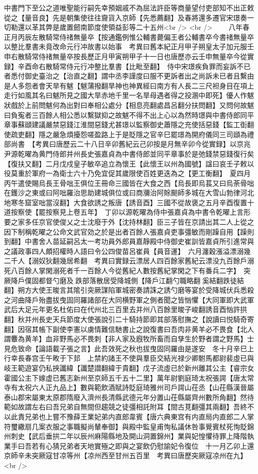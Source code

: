 中書門下至公之道唯聖能行嗣先幸預姻戚不為屈法許臣等商量望付吏部知不出正敕從之【量音良】先是朝集使往往齎貨入京師【先悉薦翻】及春將還多遷官宋璟奏一切勒還以革其弊是歲置劒南節度使領益彭等二十五州<br />
<br />
　　八年春正月丙辰左散騎常侍禇無量卒【按通鑑例惟公輔書薨偏王者公輔書卒今書禇無量卒以整比羣書未竟改命元行冲故書以始事　考異曰舊本紀正月甲子朔皇太子加元服壬申右散騎常侍禇無量卒按長歷正月甲寅朔甲子十一日也唐歷亦云壬申無量卒今從實録】辛酉命右散騎常侍元行冲整比羣書【比毗至翻】　侍中宋璟疾負罪而妄訴不已者悉付御史臺治之【治直之翻】謂中丞李謹度曰服不更訴者出之尚訴未已者且繫由是人多怨者會天旱有魃【魃蒲撥翻旱神也神異經曰南方有人長二三尺袒身目在項上走行如風其名曰魃所見之國大旱赤地千里一名旱母遇者得之投溷中即死】優人作魃狀戲於上前問魃何為出對曰奉相公處分【相息亮翻處昌呂翻分扶問翻】又問何故魃曰負寃者三百餘人相公悉以繫獄抑之故魃不得不出上心以為然時璟與中書侍郎同平章事蘇頲建議嚴禁惡錢江淮間惡錢尤甚璟以監察御史蕭隱之充使括惡錢【監工衘翻使疏吏翻】隱之嚴急煩擾怨嗟盈路上于是貶隱之官辛巳罷璟為開府儀同三司頲為禮部尚書　【考異曰唐歷云二十八日辛卯舊紀云己卯按是月無辛卯今從實録】以京兆尹源乾曜為黄門侍郎并州長史張嘉貞為中書侍郎並同平章事於是弛錢禁惡錢復行矣【復扶又翻】二月戊戍皇子敏卒追立為懷王【此懷王以州為國號】諡曰哀壬子敕以役莫重於軍府一為衛士六十乃免宜促其歲限使百姓更迭為之【更工衡翻】　夏四月丙午遣使賜烏長王骨咄王俱位王冊命三國皆在大食之西【烏長即烏萇又曰烏荼骨咄在鑊沙之東或曰阿咄羅治思助建城俱位或曰商瀰治阿賖䫻師多城在大雪山勃律河北地寒冬窟室咄當沒翻】大食欲誘之叛唐【誘音酉】三國不從故褒之五月辛酉復置十道按察使【罷按察見上卷五年】　丁卯以源乾曜為侍中張嘉貞為中書令乾曜上言形要之家多任京官使俊乂之士沈廢于外【沈持林翻】臣三子皆在京請出其二人上從之因下制稱乾曜之公命文武官効之於是出者百餘人張嘉貞吏事彊敏而剛躁自用【躁則到翻】中書舍人苗延嗣呂太一考功員外郎員嘉靜殿中侍御史崔訓皆嘉貞所引進常與之議政事四人頗招權時人語曰令公四俊苗呂崔員【員音運】　六月瀍穀漲溢漂溺幾二千人【溺奴狄翻幾居希翻　考異曰實録云漂居人四百餘家舊紀云漂没九百餘戶溺死八百餘人掌閑溺死者千一百餘人今從舊紀人數按舊紀掌閑之下有番兵二字】　突厥降戶僕固都督勺磨及跌部落散居受降城側【降戶江翻勺職略翻奚結翻跌徒結翻】朔方大使王晙言其隂引突厥謀陷軍城密奏請誅之誘勺磨等宴於受降城伏兵悉殺之河曲降戶殆盡拔曳固同羅諸部在大同横野軍之側者聞之皆忷懼【大同軍即大武軍武后大足元年更名杜佑曰在代州北三百里去并州八百餘里晙子峻翻誘音酉忷許拱翻】秋并州長史天兵節度大使張說引二十騎持節即其部落慰撫之【說讀曰悦騎奇寄翻】因宿其帳下副使李憲以虜情難信馳書止之說復書曰吾肉非黄羊必不畏食【北人謂麞為黄羊】血非野馬必不畏刺【非人家及廐牧所畜而自孳生於野者謂之野馬】士見危致命【論語載子張之言】此吾效死之秋也拔曳固同羅由是遂安　冬十月辛巳上行幸長春宫壬午畋于下邽　上禁約諸王不使與羣臣交結光禄少卿駙馬都尉裴虛已與岐王範遊宴仍私挾讖緯【讖楚譛翻緯于貴翻】戊子流虛已於新州離其公主【睿宗女霍國公主下嫁虚已舊志新州至京師五千五十二里】萬年尉劉庭琦太祝張諤【唐太常寺有太祝六人正九品上】數與範飲酒賦詩貶庭琦雅州司戶諤山茌丞【山茌縣漢晉屬泰山郡宋屬東太原郡隋廢入濟州長清縣武德元年分置山茌縣屬齊州數所角翻】然待範如故謂左右曰吾兄弟自無間但趨競之徒彊相託附耳【間古莧翻彊其兩翻】吾終不以此責兄弟也上嘗不豫薛王業妃弟内直郎韋賓【唐六典東宫有内直局内直郎二人掌符璽繖扇几案衣服之事職擬尚輦奉御】與殿中監皇甫恂私議休咎事覺賓杖死恂貶錦州刺史【武后垂拱二年以辰州麻陽縣地及開山洞置錦州】業與妃惶懼待罪上降階執業手曰吾若有心猜兄弟者天地實殛之即與之宴飲仍慰諭妃令復位　十一月乙卯上還京師辛未突厥寇甘凉等州【凉州西至甘州五百里　考異曰唐歷突厥寇凉州在九】<br />
